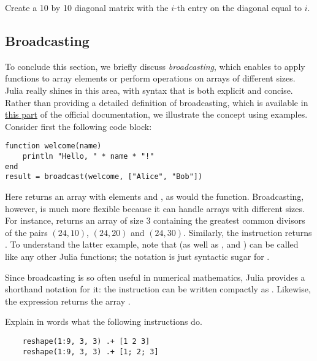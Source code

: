 \begin{task}
    Create a 10 by 10 diagonal matrix with the $i$-th entry on the diagonal equal to $i$.
\end{task}

\subsection*{Broadcasting}%
\label{sub:broadcasting}
To conclude this section,
we briefly discuss \emph{broadcasting},
which enables to apply functions to array elements or perform operations on arrays of different sizes.
Julia really shines in this area,
with syntax that is both explicit and concise.
Rather than providing a detailed definition of broadcasting,
which is available in \href{https://docs.julialang.org/en/v1/manual/arrays/#Broadcasting}{this part} of the official documentation,
we illustrate the concept using examples.
Consider first the following code block:
\begin{verbatim}
function welcome(name)
    println "Hello, " * name * "!"
end
result = broadcast(welcome, ["Alice", "Bob"])
\end{verbatim}
Here  returns an array with elements  and ,
as would the  function.
Broadcasting, however, is much more flexible because it can handle arrays with different sizes.
For instance,  returns an array of size 3 containing the greatest common divisors of the pairs $(24, 10)$, $(24, 20)$ and $(24, 30)$.
Similarly, the instruction  returns \julia{[2, 3, 4]}.
To understand the latter example, note that \julia{+} (as well as \julia{*}, \julia{-} and \julia{/}) can be called like any other Julia functions;
the notation  is just syntactic sugar for .

Since broadcasting is so often useful in numerical mathematics,
Julia provides a shorthand notation for it: the instruction 
can be written compactly as .
Likewise, the expression  returns the array \julia{[2, 3, 4]}.

\begin{task}
    Explain in words what the following instructions do.
    \begin{verbatim}
    reshape(1:9, 3, 3) .+ [1 2 3]
    reshape(1:9, 3, 3) .+ [1; 2; 3]
    \end{verbatim}
\end{task}

